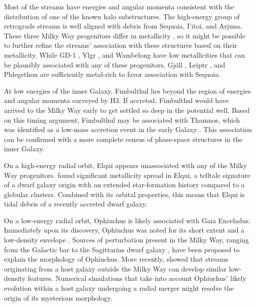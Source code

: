 \documentclass[twocolumn]{aastex63}
\newcommand{\feh}{\ensuremath{\textrm{[Fe/H]}}}
\begin{document}
Most of the streams have energies and angular momenta consistent with the distribution of one of the known halo substructures.
The high-energy group of retrograde streams is well aligned with debris from Sequoia, I'itoi, and Arjuna.
These three Milky Way progenitors differ in metallicity \citep{refs}, so it might be possible to further refine the streams' association with these structures based on their metallicity.
While GD-1 \citep[spectroscopic $\feh=-2.3$,][]{bonaca2020b}, Ylgr \citep[spectroscopic $\feh=-1.9$,][]{ibata2019}, and  Wambelong \citep[isochrone $\feh=-2.2$,][]{shipp2018} have low metallicities that can be plausibly associated with any of these progenitors, Gj\" oll \citep[spectroscopic $\feh=-1.5$,][]{hansen2020}, Leiptr \citep[isochrone $\feh=-1.6$,][]{ibata2019}, and Phlegethon \citep[spectroscopic $\feh=-1.6$,][]{ibata2018} are sufficiently metal-rich to favor association with Sequoia.

At low energies of the inner Galaxy, Fimbulthul lies beyond the region of energies and angular momenta surveyed by H3.
If accreted, Fimbulthul would have arrived to the Milky Way early to get settled so deep in the potential well.
Based on this timing argument, Fimbulthul may be associated with Thamnos, which was identified as a low-mass accretion event in the early Galaxy \citep{koppelman2019}.
This association can be confirmed with a more complete census of phase-space structures in the inner Galaxy.

On a high-energy radial orbit, Elqui appears unassociated with any of the Milky Way progenitors.
\citet{ji2020} found significant metallicity spread in Elqui, a telltale signature of a dwarf galaxy origin with an extended star-formation history compared to a globular clusters.
Combined with its orbital properties, this means that Elqui is tidal debris of a recently accreted dwarf galaxy.

On a low-energy radial orbit, Ophiuchus is likely associated with Gaia Enceladus.
Immediately upon its discovery, Ophiuchus was noted for its short extent and a low-density envelope \citep{bernard2015, sesar2015}.
Sources of perturbation present in the Milky Way, ranging from the Galactic bar \citep{price-whelan2016} to the Sagittarius dwarf galaxy \citep{lane2020}, have been proposed to explain the morphology of Ophiuchus.
More recently, \citet{carlberg2019} showed that streams originating from a host galaxy outside the Milky Way can develop similar low-density features.
Numerical simulations that take into account Ophiuchus' likely evolution within a host galaxy undergoing a radial merger might resolve the origin of its mysterious morphology.
\end{document}
